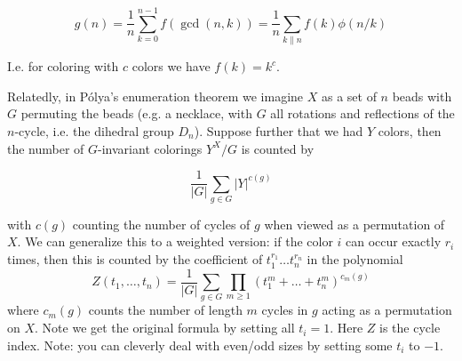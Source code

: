 \documentclass[
	a4paper,
	landscape,
	10pt,
]{article}
\begin{document}
		$$g(n) = \frac{1}{n} \sum_{k=0}^{n-1} f(\gcd(n, k))
			= \frac{1}{n}\sum_{k \| n} f(k) \phi(n / k)$$

		I.e. for coloring with $c$ colors we have $f(k) = k^c$.

		Relatedly, in P\'olya's enumeration theorem we imagine $X$ as a set of $n$
		beads with $G$ permuting the beads (e.g. a necklace, with $G$ all rotations and
		reflections of the $n$-cycle, i.e. the dihedral group $D_n$).
		Suppose further that we had $Y$ colors, then
		the number of $G$-invariant colorings $Y^X / G$ is counted by

		$$\frac{1}{|G|}\sum_{g\in G} |Y|^{c(g)}$$

		with $c(g)$ counting the number of cycles of $g$ when viewed as a permutation
		of $X$. We can generalize this to a weighted version: if the color $i$ can
		occur exactly $r_i$ times, then this is counted by the coefficient of
		$t_1^{r_1}\dots t_n^{r_n}$ in the polynomial
		$$Z(t_1,\dots,t_n) = \frac{1}{|G|}\sum_{g\in G} \prod_{m\geq 1}
			(t_1^m+\dots+t_n^m)^{c_m(g)}$$
		where $c_m(g)$ counts the number of length $m$ cycles in $g$ acting as a
		permutation on $X$. Note we get the original formula by setting all $t_i=1$.
		Here $Z$ is the cycle index. Note: you can cleverly deal with even/odd sizes
		by setting some $t_i$ to $-1$.
\end{document}
